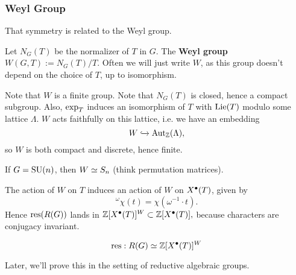 \subsubsection{Weyl Group} That symmetry is related to the Weyl group.

\begin{defn}
Let $N_G(T)$ be the normalizer of $T$ in $G$. The \textbf{Weyl group}
$W(G, T) := N_G(T)/T$. Often we will just write $W$, as this group doesn't
depend on the choice of $T$, up to isomorphism.
\end{defn}

\begin{rmk}
Note that $W$ is a finite group. Note that $N_G(T)$ is closed, hence a compact
subgroup. Also, $\operatorname{exp}_T$ induces an isomorphism of $T$ with $\operatorname{Lie}(T)$
modulo some lattice $\Lambda$. $W$ acts faithfully on this lattice, i.e. we 
have an embedding \[ W \xhookrightarrow{} \operatorname{Aut}_{\mathbb{Z}}(\Lambda), \]
so $W$ is both compact and discrete, hence finite.
\end{rmk}

\begin{exmpl}
If $G = \operatorname{SU}(n)$, then $W \simeq S_n$ (think permutation matrices).
\end{exmpl}


The action of $W$ on $T$ induces an action of $W$ on $X^\bullet(T)$, given by
\[ ^\omega \chi(t) = \chi(\omega^{-1} \cdot t). \] Hence $\operatorname{res}(R(G))$ lands
in $\mathbb{Z}[X^\bullet(T)]^W \subset \mathbb{Z}[X^\bullet(T)],$ because characters are
conjugacy invariant.

\begin{theorem}
\[ \operatorname{res}: R(G) \simeq \mathbb{Z}[X^\bullet(T)]^W \]
\end{theorem}

Later, we'll prove this in the setting of reductive algebraic groups.

